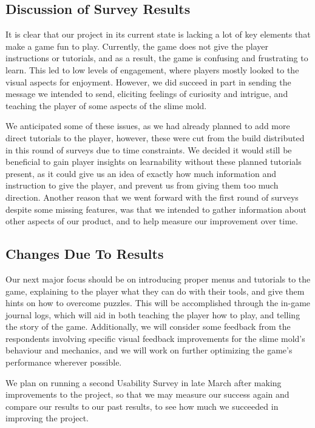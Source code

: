 \documentclass[12pt, titlepage]{article}
\begin{document}
\subsection{Discussion of Survey Results}
It is clear that our project in its current state is lacking a lot
of key elements that make a game fun to play. Currently, the game
does not give the player instructions or tutorials, and as a result,
the game is confusing and frustrating to learn. This led to low levels
of engagement, where players mostly looked to the visual aspects for
enjoyment. However, we did succeed in part in sending the message we
intended to send, eliciting feelings of curiosity and intrigue,
and teaching the player of some aspects of the slime mold.

We anticipated some of these issues, as we had already planned to add 
more direct tutorials to the player, however, these were cut from the 
build distributed in this round of surveys due to time constraints. 
We decided it would still be beneficial to gain player insights on 
learnability without these planned tutorials present, as it could 
give us an idea of exactly how much information and instruction to give 
the player, and prevent us from giving them too much direction. Another 
reason that we went forward with the first round of surveys despite some 
missing features, was that we intended to gather information 
about other aspects of our product, and to help measure our improvement 
over time.

\subsection{Changes Due To Results}
Our next major focus should be on introducing proper menus and
tutorials to the game, explaining to the player what they can do
with their tools, and give them hints on how to overcome puzzles.
This will be accomplished through the in-game journal logs, which
will aid in both teaching the player how to play, and telling
the story of the game. Additionally, we will consider some feedback
from the respondents involving specific visual feedback improvements
for the slime mold's behaviour and mechanics, and we will work on
further optimizing the game's performance wherever possible.

We plan on running a second Usability Survey in late March after
making improvements to the project, so that we may measure our
success again and compare our results to our past results, to
see how much we succeeded in improving the project.
\end{document}
